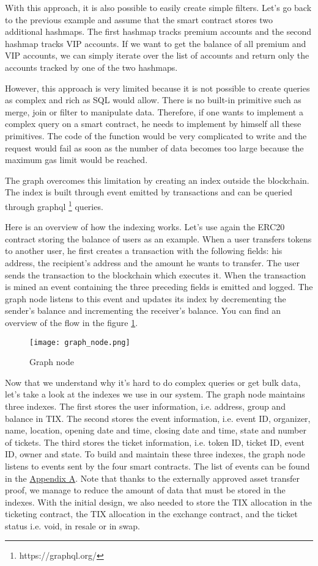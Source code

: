 \documentclass[a4paper,11pt,oneside]{report}
\begin{document}
With this approach, it is also possible to easily create simple filters. Let's go back to the previous example and assume that the smart contract stores two additional hashmaps. The first hashmap tracks premium accounts and the second hashmap tracks VIP accounts. If we want to get the balance of all premium and VIP accounts, we can simply iterate over the list of accounts and return only the accounts tracked by one of the two hashmaps.

However, this approach is very limited because it is not possible to create queries as complex and rich as SQL would allow. There is no built-in primitive such as merge, join or filter to manipulate data. Therefore, if one wants to implement a complex query on a smart contract, he needs to implement by himself all these primitives. The code of the function would be very complicated to write and the request would fail as soon as the number of data becomes too large because the maximum gas limit would be reached.

The graph overcomes this limitation by creating an index outside the blockchain. The index is built through event emitted by transactions and can be queried through graphql \footnote{https://graphql.org/} queries.

Here is an overview of how the indexing works. Let's use again the ERC20 contract storing the balance of users as an example. When a user transfers tokens to another user, he first creates a transaction with the following fields: his address, the recipient's address and the amount he wants to transfer. The user sends the transaction to the blockchain which executes it. When the transaction is mined an event containing the three preceding fields is emitted and logged. The graph node listens to this event and updates its index by decrementing the sender's balance and incrementing the receiver's balance. You can find an overview of the flow in the figure \hyperref[fig:graph_node]{\ref{fig:graph_node}}.

\begin{figure}[h!] 
  \centering
  \texttt{[image: graph\_node.png]}
  \caption{Graph node}
  \label{fig:graph_node}
\end{figure}

Now that we understand why it's hard to do complex queries or get bulk data, let's take a look at the indexes we use in our system. The graph node maintains three indexes. The first stores the user information, i.e. address, group and balance in TIX. The second stores the event information, i.e. event ID, organizer, name, location, opening date and time, closing date and time, state and number of tickets. The third stores the ticket information, i.e. token ID, ticket ID, event ID, owner and state. To build and maintain these three indexes, the graph node listens to events sent by the four smart contracts. The list of events can be found in the \hyperref[sec:appendix_a]{Appendix A}. Note that thanks to the externally approved asset transfer proof, we manage to reduce the amount of data that must be stored in the indexes. With the initial design, we also needed to store the TIX allocation in the ticketing contract, the TIX allocation in the exchange contract, and the ticket status i.e. void, in resale or in swap.
\end{document}
